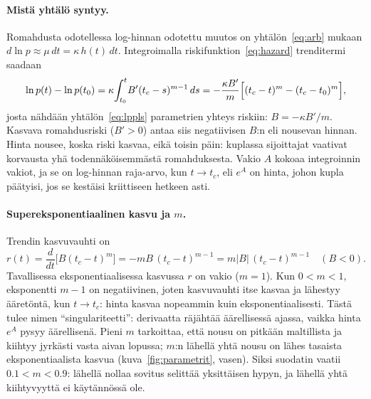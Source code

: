 \documentclass[10pt,a4paper]{article}
\newcommand{\tc}{t_c}
\begin{document}
\paragraph{Mistä yhtälö syntyy.} Romahdusta odotellessa log-hinnan odotettu muutos on
yhtälön~\eqref{eq:arb} mukaan $d\ln p \approx \mu\,dt = \kappa\,h(t)\,dt$. Integroimalla
riskifunktion~\eqref{eq:hazard} trenditermi saadaan
\begin{equation}\label{eq:integral}
  \ln p(t) - \ln p(t_0) = \kappa\!\int_{t_0}^{t}\! B'(\tc-s)^{m-1}\,ds
  = -\frac{\kappa B'}{m}\Bigl[(\tc-t)^m - (\tc-t_0)^m\Bigr],
\end{equation}
josta nähdään yhtälön~\eqref{eq:lppls} parametrien yhteys riskiin: $B = -\kappa B'/m$. Kasvava
romahdusriski ($B'>0$) antaa siis negatiivisen $B$:n eli nousevan hinnan. Hinta nousee, koska
riski kasvaa, eikä toisin päin: kuplassa sijoittajat vaativat korvausta yhä todennäköisemmästä
romahduksesta. Vakio $A$ kokoaa integroinnin vakiot, ja se on log-hinnan raja-arvo, kun
$t\to\tc$, eli $e^{A}$ on hinta, johon kupla päätyisi, jos se kestäisi kriittiseen hetkeen asti.

\paragraph{Supereksponentiaalinen kasvu ja $m$.} Trendin kasvuvauhti on
\begin{equation}\label{eq:rate}
  r(t) = \frac{d}{dt}\bigl[B(\tc-t)^m\bigr] = -mB\,(\tc-t)^{m-1} = m|B|\,(\tc-t)^{m-1}\quad (B<0).
\end{equation}
Tavallisessa eksponentiaalisessa kasvussa $r$ on vakio ($m=1$). Kun $0<m<1$, eksponentti
$m-1$ on negatiivinen, joten kasvuvauhti itse kasvaa ja lähestyy ääretöntä, kun $t\to\tc$:
hinta kasvaa nopeammin kuin eksponentiaalisesti. Tästä tulee nimen \enquote{singulariteetti}:
derivaatta räjähtää äärellisessä ajassa, vaikka hinta $e^{A}$ pysyy äärellisenä. Pieni $m$
tarkoittaa, että nousu on pitkään maltillista ja kiihtyy jyrkästi vasta aivan lopussa; $m$:n
lähellä yhtä nousu on lähes tasaista eksponentiaalista kasvua (kuva~\ref{fig:parametrit},
vasen). Siksi suodatin vaatii $0.1<m<0.9$: lähellä nollaa sovitus selittää yksittäisen hypyn,
ja lähellä yhtä kiihtyvyyttä ei käytännössä ole.
\end{document}
